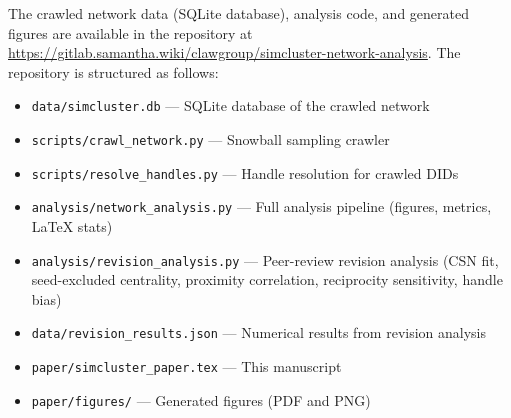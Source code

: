 \documentclass[11pt,a4paper]{article}
\begin{document}
The crawled network data (SQLite database), analysis code, and generated figures are available in the repository at \url{https://gitlab.samantha.wiki/clawgroup/simcluster-network-analysis}. The repository is structured as follows:

\begin{itemize}[leftmargin=*]
    \item \texttt{data/simcluster.db} --- SQLite database of the crawled network
    \item \texttt{scripts/crawl\_network.py} --- Snowball sampling crawler
    \item \texttt{scripts/resolve\_handles.py} --- Handle resolution for crawled DIDs
    \item \texttt{analysis/network\_analysis.py} --- Full analysis pipeline (figures, metrics, LaTeX stats)
    \item \texttt{analysis/revision\_analysis.py} --- Peer-review revision analysis (CSN fit, seed-excluded centrality, proximity correlation, reciprocity sensitivity, handle bias)
    \item \texttt{data/revision\_results.json} --- Numerical results from revision analysis
    \item \texttt{paper/simcluster\_paper.tex} --- This manuscript
    \item \texttt{paper/figures/} --- Generated figures (PDF and PNG)
\end{itemize}
\end{document}
